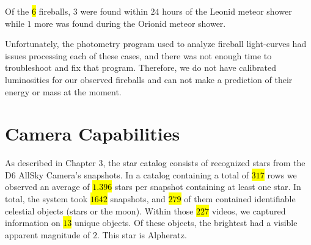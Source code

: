 Of the \hl{$6$} fireballs, $3$ were found within $24$ hours of the Leonid meteor shower while $1$ more was found during the Orionid meteor shower.  

Unfortunately, the photometry program used to analyze fireball light-curves had issues processing each of these cases, and there was not enough time to troubleshoot and fix that program.  
Therefore, we do not have calibrated luminosities for our observed fireballs and can not make a prediction of their energy or mass at the moment. 


\section{Camera Capabilities}

As described in Chapter 3, the star catalog consists of recognized stars from the D6 AllSky Camera's snapshots.
In a catalog containing a total of \hl{$317$} rows we observed an average of \hl{$1.396$} stars per snapshot containing at least one star.
In total, the system took \hl{$1642$} snapshots, and \hl{$279$} of them contained identifiable celestial objects (stars or the moon).  
Within those \hl{$227$} videos, we captured information on \hl{$13$} unique objects.
Of these objects, the brightest had a visible apparent magnitude of $2$.  
This star is Alpheratz.


